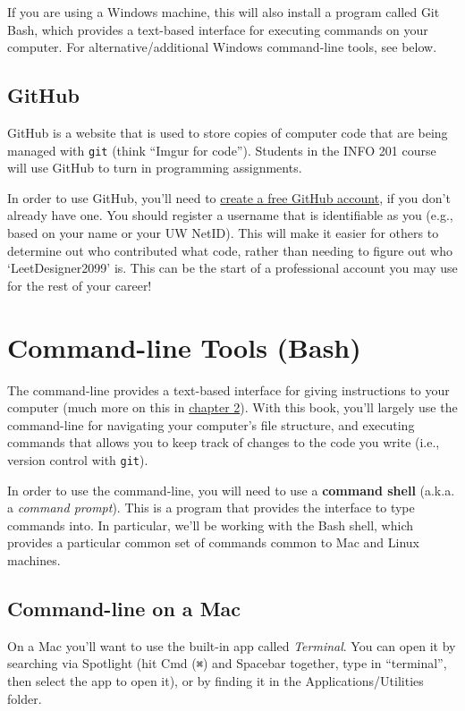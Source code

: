 \documentclass[]{book}
\theoremstyle{definition}
\theoremstyle{definition}
\theoremstyle{remark}
\begin{document}
If you are using a Windows machine, this will also install a program
called Git Bash, which provides a text-based interface for executing
commands on your computer. For alternative/additional Windows
command-line tools, see below.

\subsection{GitHub}\label{github}

GitHub is a website that is used to store copies of computer code that
are being managed with \texttt{git} (think ``Imgur for code''). Students
in the INFO 201 course will use GitHub to turn in programming
assignments.

In order to use GitHub, you'll need to
\href{https://github.com/join}{create a free GitHub account}, if you
don't already have one. You should register a username that is
identifiable as you (e.g., based on your name or your UW NetID). This
will make it easier for others to determine out who contributed what
code, rather than needing to figure out who `LeetDesigner2099' is. This
can be the start of a professional account you may use for the rest of
your career!

\section{Command-line Tools (Bash)}\label{command-line-tools-bash}

The command-line provides a text-based interface for giving instructions
to your computer (much more on this in
\protect\hyperlink{command-line}{chapter 2}). With this book, you'll
largely use the command-line for navigating your computer's file
structure, and executing commands that allows you to keep track of
changes to the code you write (i.e., version control with \texttt{git}).

In order to use the command-line, you will need to use a \textbf{command
shell} (a.k.a. a \emph{command prompt}). This is a program that provides
the interface to type commands into. In particular, we'll be working
with the Bash shell, which provides a particular common set of commands
common to Mac and Linux machines.

\subsection{Command-line on a Mac}\label{command-line-on-a-mac}

On a Mac you'll want to use the built-in app called \emph{Terminal}. You
can open it by searching via Spotlight (hit Cmd (\texttt{⌘}) and
Spacebar together, type in ``terminal'', then select the app to open
it), or by finding it in the Applications/Utilities folder.
\end{document}
